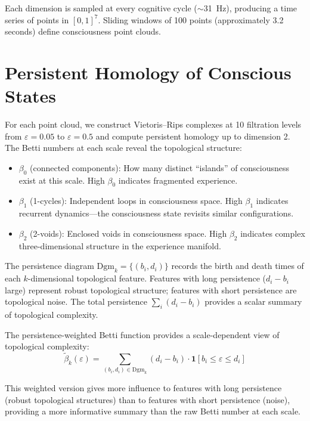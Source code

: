 \documentclass[12pt]{book}
\begin{document}
Each dimension is sampled at every cognitive cycle ($\sim$31~Hz), producing a time series of points in $[0,1]^7$. Sliding windows of 100 points (approximately 3.2 seconds) define consciousness point clouds.

\section{Persistent Homology of Conscious States}

For each point cloud, we construct Vietoris--Rips complexes at 10 filtration levels from $\varepsilon = 0.05$ to $\varepsilon = 0.5$ and compute persistent homology up to dimension 2. The Betti numbers at each scale reveal the topological structure:

\begin{itemize}
  \item $\beta_0$ (connected components): How many distinct ``islands'' of consciousness exist at this scale. High $\beta_0$ indicates fragmented experience.
  \item $\beta_1$ (1-cycles): Independent loops in consciousness space. High $\beta_1$ indicates recurrent dynamics---the consciousness state revisits similar configurations.
  \item $\beta_2$ (2-voids): Enclosed voids in consciousness space. High $\beta_2$ indicates complex three-dimensional structure in the experience manifold.
\end{itemize}

The persistence diagram $\text{Dgm}_k = \{(b_i, d_i)\}$ records the birth and death times of each $k$-dimensional topological feature. Features with long persistence ($d_i - b_i$ large) represent robust topological structure; features with short persistence are topological noise. The total persistence $\sum_i (d_i - b_i)$ provides a scalar summary of topological complexity.

The persistence-weighted Betti function provides a scale-dependent view of topological complexity:
\begin{equation}
\tilde{\beta}_k(\varepsilon) = \sum_{(b_i, d_i) \in \text{Dgm}_k} (d_i - b_i) \cdot \mathbf{1}[b_i \leq \varepsilon \leq d_i]
\end{equation}

This weighted version gives more influence to features with long persistence (robust topological structures) than to features with short persistence (noise), providing a more informative summary than the raw Betti number at each scale.
\end{document}
